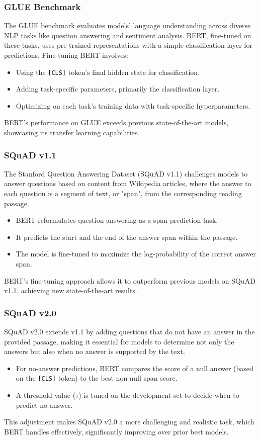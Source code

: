 \documentclass[11pt,xcolor={dvipsnames},hyperref={pdftex,pdfpagemode=UseNone,hidelinks,pdfdisplaydoctitle=true},usepdftitle=false]{beamer}
\begin{document}
\begin{frame}
\frametitle{GLUE Benchmark}
The GLUE benchmark evaluates models' language understanding across diverse NLP tasks like question answering and sentiment analysis. BERT, fine-tuned on these tasks, uses pre-trained representations with a simple classification layer for predictions. Fine-tuning BERT involves:
\begin{itemize}
    \item Using the {\tt [CLS]} token's final hidden state for classification.
    \item Adding task-specific parameters, primarily the classification layer.
    \item Optimizing on each task's training data with task-specific hyperparameters.
\end{itemize}
BERT's performance on GLUE exceeds previous state-of-the-art models, showcasing its transfer learning capabilities.
\end{frame}
    

\begin{frame}
\frametitle{SQuAD v1.1}
The Stanford Question Answering Dataset (SQuAD v1.1) challenges models to answer questions based on content from Wikipedia articles, where the answer to each question is a segment of text, or "span", from the corresponding reading passage.
\begin{itemize}
    \item BERT reformulates question answering as a span prediction task.
    \item It predicts the start and the end of the answer span within the passage.
    \item The model is fine-tuned to maximize the log-probability of the correct answer span.
\end{itemize}
BERT's fine-tuning approach allows it to outperform previous models on SQuAD v1.1, achieving new state-of-the-art results.
\end{frame}

\begin{frame}
\frametitle{SQuAD v2.0}
SQuAD v2.0 extends v1.1 by adding questions that do not have an answer in the provided passage, making it essential for models to determine not only the answers but also when no answer is supported by the text.
\begin{itemize}
    \item For no-answer predictions, BERT compares the score of a null answer (based on the {\tt [CLS]} token) to the best non-null span score.
    \item A threshold value ($\tau$) is tuned on the development set to decide when to predict no answer.
\end{itemize}
This adjustment makes SQuAD v2.0 a more challenging and realistic task, which BERT handles effectively, significantly improving over prior best models.
\end{frame}
\end{document}

